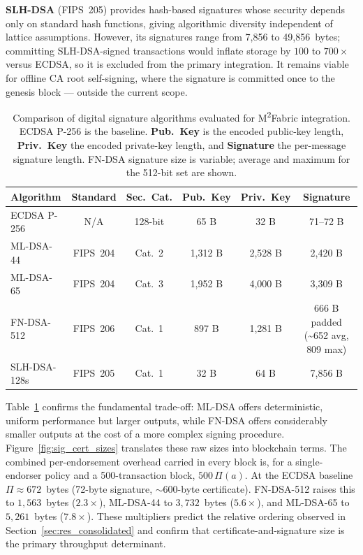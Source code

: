 \documentclass{ieeetj}
\newcommand{\mfabric}{M\textsuperscript{2}Fabric}
\begin{document}
\textbf{SLH-DSA} (FIPS~205) provides hash-based signatures whose security
depends only on standard hash functions, giving algorithmic diversity
independent of lattice assumptions. However, its signatures range from 7{,}856
to 49{,}856~bytes; committing SLH-DSA-signed transactions would inflate storage
by $100$ to $700\times$ versus ECDSA, so it is excluded from the primary
integration. It remains viable for offline CA root self-signing, where the
signature is committed once to the genesis block --- outside the current scope.

\begin{table}[ht]
\centering
\caption[Comparison of digital signature algorithms.]
{Comparison of digital signature algorithms evaluated for \mfabric{}
integration. ECDSA P-256 is the baseline. \textbf{Pub.\ Key} is the encoded
public-key length, \textbf{Priv.\ Key} the encoded private-key length, and
\textbf{Signature} the per-message signature length. FN-DSA signature size is
variable; average and maximum for the 512-bit set are shown.}
\label{tab:alg_comparison}
\setlength{\tabcolsep}{5pt}
\footnotesize
\begin{tabular}{@{}lccccc@{}}
\toprule
\textbf{Algorithm} & \textbf{Standard} & \textbf{Sec.~Cat.} &
\textbf{Pub.~Key} & \textbf{Priv.~Key} & \textbf{Signature} \\
\midrule
ECDSA P-256  & N/A       & 128-bit & 65 B    & 32 B    & 71--72 B \\
ML-DSA-44    & FIPS~204  & Cat.~2  & 1,312 B & 2,528 B & 2,420 B  \\
ML-DSA-65    & FIPS~204  & Cat.~3  & 1,952 B & 4,000 B & 3,309 B  \\
FN-DSA-512   & FIPS~206  & Cat.~1  & 897 B   & 1,281 B & 666 B padded (\textasciitilde 652 avg, 809 max) \\
SLH-DSA-128s & FIPS~205  & Cat.~1  & 32 B    & 64 B    & 7,856 B \\
\bottomrule
\end{tabular}
\end{table}

Table~\ref{tab:alg_comparison} confirms the fundamental trade-off: ML-DSA offers
deterministic, uniform performance but larger outputs, while FN-DSA offers
considerably smaller outputs at the cost of a more complex signing procedure.
Figure~\ref{fig:sig_cert_sizes} translates these raw sizes into blockchain
terms. The combined per-endorsement overhead carried in every block is, for a
single-endorser policy and a 500-transaction block, $500\,\Pi(a)$. At the ECDSA
baseline $\Pi\approx672$~bytes (72-byte signature, $\sim$600-byte certificate).
FN-DSA-512 raises this to $1{,}563$~bytes ($2.3\times$), ML-DSA-44 to
$3{,}732$~bytes ($5.6\times$), and ML-DSA-65 to $5{,}261$~bytes ($7.8\times$).
These multipliers predict the relative ordering observed in
Section~\ref{sec:res_consolidated} and confirm that certificate-and-signature
size is the primary throughput determinant.
\end{document}
